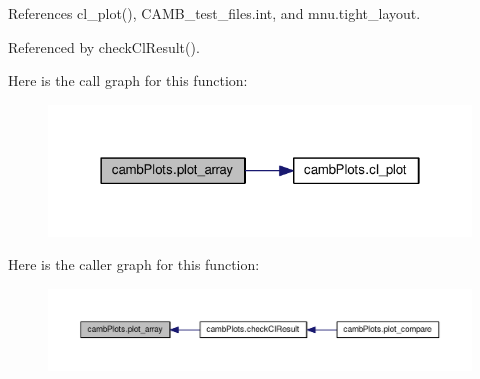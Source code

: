 References cl\+\_\+plot(), C\+A\+M\+B\+\_\+test\+\_\+files.\+int, and mnu.\+tight\+\_\+layout.



Referenced by check\+Cl\+Result().

Here is the call graph for this function\+:
\nopagebreak
\begin{figure}[H]
\begin{center}
\leavevmode
\includegraphics[width=322pt]{namespacecambPlots_a0929c1777ebbcf7b4f020b63ec6ce36f_cgraph}
\end{center}
\end{figure}
Here is the caller graph for this function\+:
\nopagebreak
\begin{figure}[H]
\begin{center}
\leavevmode
\includegraphics[width=350pt]{namespacecambPlots_a0929c1777ebbcf7b4f020b63ec6ce36f_icgraph}
\end{center}
\end{figure}
\mbox{\label{namespacecambPlots_a5ba7df009754321b923630f25d8f7ddc}} 
